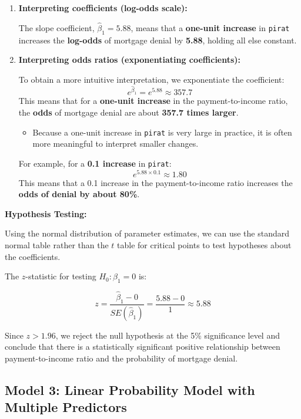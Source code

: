 \documentclass[
  12pt,
  letterpaper,
]{scrbook}
\providecommand{\tightlist}{%
  \setlength{\itemsep}{0pt}\setlength{\parskip}{0pt}}
\renewcommand{\tightlist}{\setlength{\itemsep}{0.5\baselineskip}\setlength{\parskip}{0.2\baselineskip}}
\theoremstyle{definition}
\theoremstyle{plain}
\theoremstyle{remark}
\begin{document}
\begin{enumerate}
\def\labelenumi{\arabic{enumi}.}
\item
  \textbf{Interpreting coefficients (log-odds scale):}

  The slope coefficient, \(\hat{\beta}_1 = 5.88\), means that a
  \textbf{one-unit increase} in \texttt{pirat} increases the
  \textbf{log-odds} of mortgage denial by \textbf{5.88}, holding all
  else constant.
\item
  \textbf{Interpreting odds ratios (exponentiating coefficients):}

  To obtain a more intuitive interpretation, we exponentiate the
  coefficient: \[
  e^{\hat{\beta}_1} = e^{5.88} \approx 357.7
  \] This means that for a \textbf{one-unit increase} in the
  payment-to-income ratio, the \textbf{odds} of mortgage denial are
  about \textbf{357.7 times larger}.

  \begin{itemize}
  \tightlist
  \item
    Because a one-unit increase in \texttt{pirat} is very large in
    practice, it is often more meaningful to interpret smaller changes.
  \end{itemize}

  For example, for a \textbf{0.1 increase} in \texttt{pirat}: \[
  e^{5.88 \times 0.1} \approx 1.80
  \] This means that a 0.1 increase in the payment-to-income ratio
  increases the \textbf{odds of denial by about 80\%}.
\end{enumerate}

\textbf{Hypothesis Testing:}

Using the normal distribution of parameter estimates, we can use the
standard normal table rather than the \(t\) table for critical points to
test hypotheses about the coefficients.

The \(z\)-statistic for testing \(H_0: \beta_1 = 0\) is:

\[
z = \frac{\hat{\beta}_1 - 0}{SE(\hat{\beta}_1)} = \frac{5.88 - 0}{1} \approx 5.88
\]

Since \(z > 1.96\), we reject the null hypothesis at the 5\%
significance level and conclude that there is a statistically
significant positive relationship between payment-to-income ratio and
the probability of mortgage denial.

\subsection{Model 3: Linear Probability Model with Multiple
Predictors}\label{model-3-linear-probability-model-with-multiple-predictors}
\end{document}
